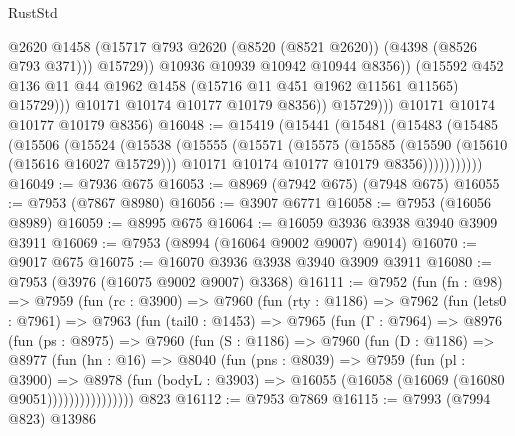 \begin{lexlean}{RustStd}
\begin{coremodule}
                            @2620
                            @1458
                            (@15717 @793 @2620 (@8520 (@8521 @2620)) (@4398 (@8526 @793 @371)))
                            @15729))
                        @10936
                        @10939
                        @10942
                        @10944
                        @8356))
                    (@15592
                      @452
                      @136
                      @11
                      @44
                      @1962
                      @1458
                      (@15716 @11 @451 @1962 @11561 @11565)
                      @15729)))
                @10171
                @10174
                @10177
                @10179
                @8356))
            @15729)))
      @10171
      @10174
      @10177
      @10179
      @8356)
@16048 := @15419
    (@15441
      (@15481
        (@15483
          (@15485
            (@15506
              (@15524
                (@15538
                  (@15555
                    (@15571
                      (@15575
                        (@15585
                          (@15590 (@15610 (@15616 @16027 @15729)))
                          @10171
                          @10174
                          @10177
                          @10179
                          @8356)))))))))))
@16049 := @7936 @675
@16053 := @8969 (@7942 @675) (@7948 @675)
@16055 := @7953 (@7867 @8980)
@16056 := @3907 @6771
@16058 := @7953 (@16056 @8989)
@16059 := @8995 @675
@16064 := @16059 @3936 @3938 @3940 @3909 @3911
@16069 := @7953 (@8994 (@16064 @9002 @9007) @9014)
@16070 := @9017 @675
@16075 := @16070 @3936 @3938 @3940 @3909 @3911
@16080 := @7953 (@3976 (@16075 @9002 @9007) @3368)
@16111 := @7952
    (fun (fn : @98) =>
    @7959
      (fun (rc : @3900) =>
      @7960
        (fun (rty : @1186) =>
        @7962
          (fun (lets0 : @7961) =>
          @7963
            (fun (tail0 : @1453) =>
            @7965
              (fun (Γ : @7964) =>
              @8976
                (fun (ps : @8975) =>
                @7960
                  (fun (S : @1186) =>
                  @7960
                    (fun (D : @1186) =>
                    @8977
                      (fun (hn : @16) =>
                      @8040
                        (fun (pns : @8039) =>
                        @7959
                          (fun (pl : @3900) =>
                          @8978
                            (fun (bodyL : @3903) =>
                            @16055 (@16058 (@16069 (@16080 @9051))))))))))))))))
    @823
@16112 := @7953 @7869
@16115 := @7993 (@7994 @823) @13986

\end{coremodule}
\end{lexlean}
